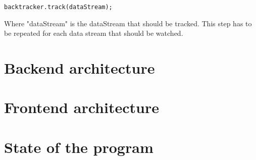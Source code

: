\begin{lstlisting}
backtracker.track(dataStream);
\end{lstlisting}

Where "dataStream" is the dataStream that should be tracked. This step has to be repeated for each data stream that should be watched.

\section{Backend architecture}
\label{fbBackend}


\section{Frontend architecture}
\label{fbFrontend}


\section{State of the program}
\label{fbState}
